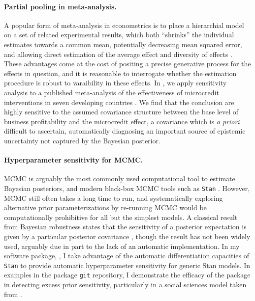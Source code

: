 \paragraph{Partial pooling in meta-analysis.}

A popular form of meta-analysis in econometrics is to place a hierarchial model
on a set of related experimental results, which both ``shrinks'' the individual
estimates towards a common mean, potentially decreasing mean squared error, and
allowing direct estimation of the average effect and diversity of effects
\citep{rubin:1981:estimation,gelman:1992:inference}. These advantages come at
the cost of positing a precise generative process for the effects in question,
and it is reasonable to interrogate whether the estimation procedure is robust
to varaibility in these effects.  In \citet{giordano:2016:microcredit}, we apply
sensitivity analysis to a published meta-analysis of the effectiveness of
microcredit interventions in seven developing countries
\citep{meager:2019:microcredit}.  We find that the conclusion are highly
sensitive to the assumed covariance structure between the base level of business
profitability and the microcredit effect, a covariance which is {\em a priori}
difficult to ascertain, automatically diagnosing an important source of
epistemic uncertainty not captured by the Bayesian posterior.


\paragraph{Hyperparameter sensitivity for MCMC.}

MCMC is arguably the most commonly used computational tool to estimate Bayesian
posteriors, and modern black-box MCMC tools such as \texttt{Stan} \citep{rstan,
carpenter:2017:stan}.  However, MCMC still often takes a long time to run, and
systematically exploring alternative prior parameterizations by re-running MCMC
would be computationally prohibitive for all but the simplest models. A
classical result from Bayesian robustness states that the sensitivity of a
posterior expectation is given by a particular posterior covariance
\citep{gustafson:1996:localposterior, basu:1996:local}, though the result has
not been widely used, arguably due in part to the lack of an automatic
implementation. In my software package, \citet{giordano:2020:rstansensitivity},
I take advantage of the automatic differentiation capacities of
\texttt{Stan} to provide automatic hyperparameter sensitivity for
generic Stan models.  In examples in the package \texttt{git} repository,
I demonstrate the efficacy of the package in detecting excess prior
sensitivity, particularly in a social sciences model taken from
\citet[Chapter 13.5]{gelman:2006:arm}.



